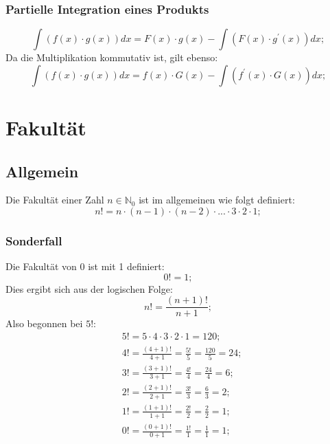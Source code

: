 \documentclass[a4paper]{article}
\begin{document}
\subsubsection{Partielle Integration eines Produkts}
\[
	\int \left( f(x) \cdot g(x) \right) dx = F(x) \cdot g(x) - \int \left( F(x) \cdot g^\prime(x) \right) dx ;
\]
Da die Multiplikation kommutativ ist, gilt ebenso:
\[
	\int \left( f(x) \cdot g(x) \right) dx = f(x) \cdot G(x) - \int \left( f^\prime(x) \cdot G(x) \right) dx ;
\]

\section{Fakultät}

\subsection{Allgemein}
Die Fakultät einer Zahl $n \in \mathbb{N}_0$ ist im allgemeinen wie folgt definiert:
\[
	n! = n \cdot (n - 1) \cdot (n - 2) \cdot ... \cdot 3 \cdot 2 \cdot 1 ;
\]
\subsubsection{Sonderfall}
Die Fakultät von 0 ist mit 1 definiert:
\[
	0! = 1;
\]
Dies ergibt sich aus der logischen Folge:
\[
	n! = \frac{(n + 1)!}{n + 1} ;
\]
Also begonnen bei $5!$:
\begin{align*}
	& 5! = 5 \cdot 4 \cdot 3 \cdot 2 \cdot 1 = 120 ;
	\\
	& 4! = \frac{(4 + 1)!}{4 + 1} = \frac{5!}{5} = \frac{120}{5} = 24 ;
	\\
	& 3! = \frac{(3 + 1)!}{3 + 1} = \frac{4!}{4} = \frac{24}{4} = 6 ;
	\\
	& 2! = \frac{(2 + 1)!}{2 + 1} = \frac{3!}{3} = \frac{6}{3} = 2 ;
	\\
	& 1! = \frac{(1 + 1)!}{1 + 1} = \frac{2!}{2} = \frac{2}{2} = 1 ;
	\\
	& 0! = \frac{(0 + 1)!}{0 + 1} = \frac{1!}{1} = \frac{1}{1} = 1 ;
\end{align*}
\end{document}
